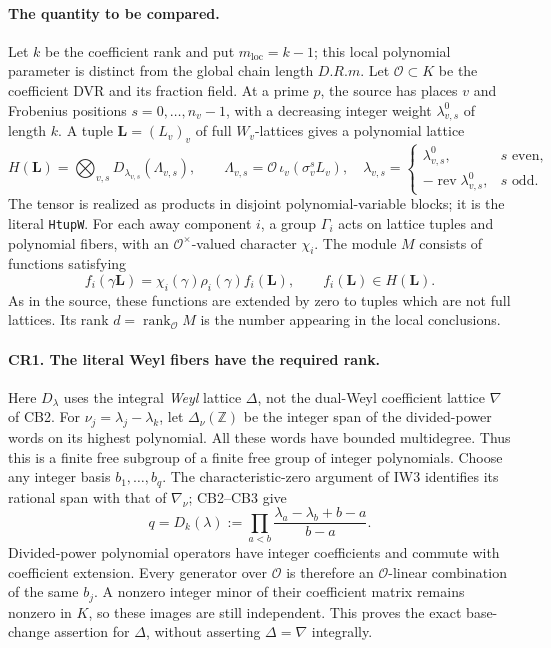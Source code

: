 \documentclass[11pt,a4paper]{article}
\numberwithin{equation}{section}
\theoremstyle{remark}\newtheorem{remark}[theorem]{Remark}
\begin{document}
\paragraph{The quantity to be compared.}
Let $k$ be the coefficient rank and put $m_{\mathrm{loc}}=k-1$;
this local polynomial parameter is distinct from the global chain
length $D.R.m$. Let $\mathcal O\subset K$ be the coefficient DVR and
its fraction field. At a prime $p$, the source has places $v$ and
Frobenius positions $s=0,\ldots,n_v-1$, with a decreasing integer
weight $\lambda^0_{v,s}$ of length $k$. A tuple $\mathbf L=(L_v)_v$
of full $W_v$-lattices gives a polynomial lattice
\[
 H(\mathbf L)=\bigotimes_{v,s}
       D_{\lambda_{v,s}}(\Lambda_{v,s}),\qquad
 \Lambda_{v,s}=\mathcal O\,\iota_v(\sigma_v^s L_v),
 \quad
 \lambda_{v,s}=
 \begin{cases}
 \lambda^0_{v,s},&s\text{ even},\\
 -\operatorname{rev}\lambda^0_{v,s},&s\text{ odd}.
 \end{cases}                                                    \tag{CR.1}
\]
The tensor is realized as products in disjoint polynomial-variable
blocks; it is the literal \texttt{HtupW}.
For each away component $i$, a group $\Gamma_i$ acts on lattice tuples
and polynomial fibers, with an $\mathcal O^{\times}$-valued character
$\chi_i$. The module $M$ consists of functions satisfying
\[
 f_i(\gamma\mathbf L)=\chi_i(\gamma)\rho_i(\gamma)f_i(\mathbf L),
 \qquad f_i(\mathbf L)\in H(\mathbf L).
                                                               \tag{CR.2}
\]
As in the source, these functions are extended by zero to tuples which
are not full lattices. Its rank $d=\operatorname{rank}_{\mathcal O}M$
is the number appearing in the local conclusions.

\paragraph{CR1. The literal Weyl fibers have the required rank.}
Here $D_\lambda$ uses the integral \emph{Weyl} lattice $\Delta$,
not the dual-Weyl coefficient lattice $\nabla$ of CB2.
For $\nu_j=\lambda_j-\lambda_k$, let $\Delta_\nu(\mathbb Z)$ be the
integer span of the divided-power words on its highest polynomial.
All these words have bounded multidegree. Thus this is a finite free
subgroup of a finite free group of integer polynomials. Choose any
integer basis $b_1,\ldots,b_q$. The characteristic-zero argument of IW3
identifies its rational span with that of $\nabla_\nu$; CB2--CB3 give
\[
 q=D_k(\lambda):=
       \prod_{a<b}\frac{\lambda_a-\lambda_b+b-a}{b-a}.
                                                               \tag{CR.3}
\]
Divided-power polynomial operators have integer coefficients and commute
with coefficient extension. Every generator over $\mathcal O$ is
therefore an $\mathcal O$-linear combination of the same $b_j$.
A nonzero integer minor of their coefficient matrix remains nonzero in
$K$, so these images are still independent. This proves the exact
base-change assertion for $\Delta$, without asserting
$\Delta=\nabla$ integrally.
\end{document}
